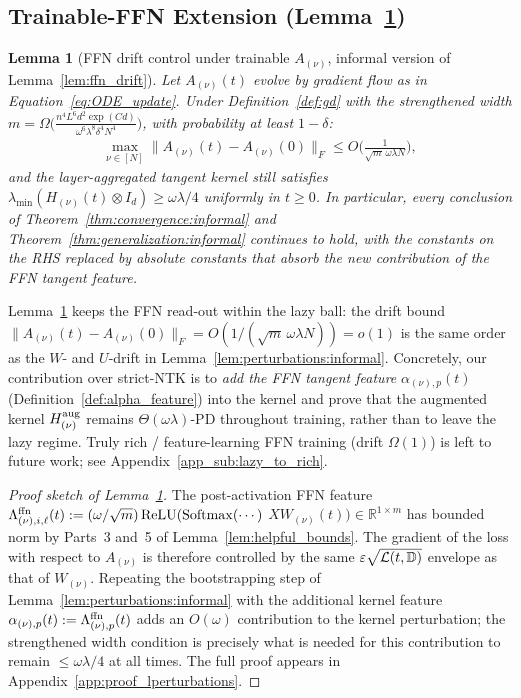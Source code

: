 \documentclass[11pt]{article}
\theoremstyle{plain}
\newtheorem{lemma}[theorem]{Lemma}
\newcommand{\R}{\mathbb{R}}
\begin{document}
\subsection{Trainable-FFN Extension (Lemma~\ref{lem:ffn_drift:informal})}\label{app_sub:ffn_drift_main}

\begin{lemma}[FFN drift control under trainable $A_{(\nu)}$, informal version of Lemma~\ref{lem:ffn_drift}]\label{lem:ffn_drift:informal}
    Let $A_{(\nu)}(t)$ evolve by gradient flow as in Equation~\eqref{eq:ODE_update}. Under Definition~\ref{def:gd} with the strengthened width $m = \Omega\big(\frac{n^4 L^6 d^2 \exp(Cd)}{\omega^6 \lambda^8 \delta^4 N^4}\big)$, with probability at least $1-\delta$:
    \begin{align*}
        \max_{\nu\in[N]}\|A_{(\nu)}(t) - A_{(\nu)}(0)\|_F \leq O\Big(\frac{1}{\sqrt{m}\,\omega\lambda N}\Big),
    \end{align*}
    and the layer-aggregated tangent kernel still satisfies $\lambda_{\min}(H_{(\nu)}(t)\otimes I_d) \ge \omega\lambda/4$ uniformly in $t\ge 0$. In particular, every conclusion of Theorem~\ref{thm:convergence:informal} and Theorem~\ref{thm:generalization:informal} continues to hold, with the constants on the RHS replaced by absolute constants that absorb the new contribution of the FFN tangent feature.
\end{lemma}

 Lemma~\ref{lem:ffn_drift:informal} keeps the FFN read-out within the lazy ball: the drift bound $\|A_{(\nu)}(t)-A_{(\nu)}(0)\|_F = O(1/(\sqrt m\,\omega\lambda N)) = o(1)$ is the same order as the $W$- and $U$-drift in Lemma~\ref{lem:perturbations:informal}. Concretely, our contribution over strict-NTK \citep{dzps19} is to {\it add the FFN tangent feature} $\alpha_{(\nu),p}(t)$ (Definition~\ref{def:alpha_feature}) into the kernel and prove that the augmented kernel $H^{\rm aug}_{(\nu)}$ remains $\Theta(\omega\lambda)$-PD throughout training, rather than to leave the lazy regime. Truly rich / feature-learning FFN training (drift $\Omega(1)$) is left to future work; see Appendix~\ref{app_sub:lazy_to_rich}.

\begin{proof}[Proof sketch of Lemma~\ref{lem:ffn_drift:informal}]
    The post-activation FFN feature $\Lambda_{(\nu),i,\ell}^{\rm ffn}(t) := (\omega/\sqrt m)\,{\rm ReLU}(\mathrm{Softmax}(\cdots)$ $ X W_{(\nu)}(t)) \in \R^{1\times m}$ has bounded norm by Parts~3 and~5 of Lemma~\ref{lem:helpful_bounds}. The gradient of the loss with respect to $A_{(\nu)}$ is therefore controlled by the same $\varepsilon\sqrt{{\cal L}(t,\mathbb{D})}$ envelope as that of $W_{(\nu)}$. Repeating the bootstrapping step of Lemma~\ref{lem:perturbations:informal} with the additional kernel feature $\alpha_{(\nu),p}(t):= \Lambda^{\rm ffn}_{(\nu),p}(t)$ adds an $O(\omega)$ contribution to the kernel perturbation; the strengthened width condition is precisely what is needed for this contribution to remain $\le \omega\lambda/4$ at all times. The full proof appears in Appendix~\ref{app:proof_lperturbations}.
\end{proof}
\end{document}
